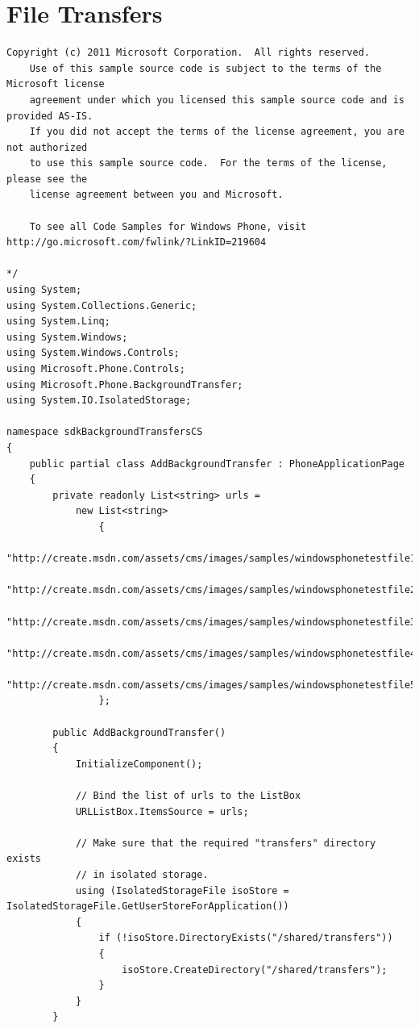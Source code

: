 \documentclass[a4paper,10pt]{scrreprt}
\begin{document}
\chapter{File Transfers}
\begin{lstlisting}[caption=Background File Transfer]
   Copyright (c) 2011 Microsoft Corporation.  All rights reserved. 
    Use of this sample source code is subject to the terms of the Microsoft license  
    agreement under which you licensed this sample source code and is provided AS-IS. 
    If you did not accept the terms of the license agreement, you are not authorized  
    to use this sample source code.  For the terms of the license, please see the  
    license agreement between you and Microsoft. 
   
    To see all Code Samples for Windows Phone, visit http://go.microsoft.com/fwlink/?LinkID=219604  
   
*/ 
using System; 
using System.Collections.Generic; 
using System.Linq; 
using System.Windows; 
using System.Windows.Controls; 
using Microsoft.Phone.Controls; 
using Microsoft.Phone.BackgroundTransfer; 
using System.IO.IsolatedStorage; 
 
namespace sdkBackgroundTransfersCS 
{ 
    public partial class AddBackgroundTransfer : PhoneApplicationPage 
    { 
        private readonly List<string> urls = 
            new List<string> 
                { 
                    "http://create.msdn.com/assets/cms/images/samples/windowsphonetestfile1.png",   
                    "http://create.msdn.com/assets/cms/images/samples/windowsphonetestfile2.png",   
                    "http://create.msdn.com/assets/cms/images/samples/windowsphonetestfile3A.png",   
                    "http://create.msdn.com/assets/cms/images/samples/windowsphonetestfile4.png",   
                    "http://create.msdn.com/assets/cms/images/samples/windowsphonetestfile5.png",   
                }; 
 
        public AddBackgroundTransfer() 
        { 
            InitializeComponent(); 
 
            // Bind the list of urls to the ListBox 
            URLListBox.ItemsSource = urls; 
 
            // Make sure that the required "transfers" directory exists 
            // in isolated storage. 
            using (IsolatedStorageFile isoStore = IsolatedStorageFile.GetUserStoreForApplication()) 
            { 
                if (!isoStore.DirectoryExists("/shared/transfers")) 
                { 
                    isoStore.CreateDirectory("/shared/transfers"); 
                } 
            } 
        } 
 

\end{lstlisting}
\end{document}
